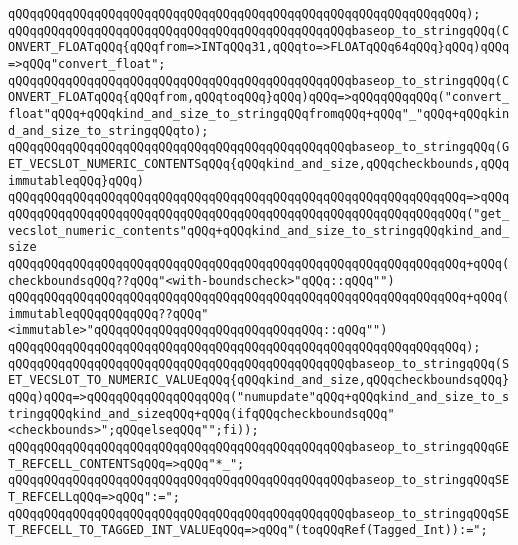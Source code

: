 \verb|qQQqqQQqqQQqqQQqqQQqqQQqqQQqqQQqqQQqqQQqqQQqqQQqqQQqqQQqqQQqqQQq);|\newline
\newline
\verb|qQQqqQQqqQQqqQQqqQQqqQQqqQQqqQQqqQQqqQQqqQQqqQQqbaseop_to_stringqQQq(CONVERT_FLOATqQQq{qQQqfrom=>INTqQQq31,qQQqto=>FLOATqQQq64qQQq}qQQq)qQQq=>qQQq"convert_float";|\newline
\verb|qQQqqQQqqQQqqQQqqQQqqQQqqQQqqQQqqQQqqQQqqQQqqQQqbaseop_to_stringqQQq(CONVERT_FLOATqQQq{qQQqfrom,qQQqtoqQQq}qQQq)qQQq=>qQQqqQQqqQQq("convert_float"qQQq+qQQqkind_and_size_to_stringqQQqfromqQQq+qQQq"_"qQQq+qQQqkind_and_size_to_stringqQQqto);|\newline
\newline
\verb|qQQqqQQqqQQqqQQqqQQqqQQqqQQqqQQqqQQqqQQqqQQqqQQqbaseop_to_stringqQQq(GET_VECSLOT_NUMERIC_CONTENTSqQQq{qQQqkind_and_size,qQQqcheckbounds,qQQqimmutableqQQq}qQQq)|\newline
\verb|qQQqqQQqqQQqqQQqqQQqqQQqqQQqqQQqqQQqqQQqqQQqqQQqqQQqqQQqqQQqqQQq=>qQQq|\newline
\verb|qQQqqQQqqQQqqQQqqQQqqQQqqQQqqQQqqQQqqQQqqQQqqQQqqQQqqQQqqQQqqQQq("get_vecslot_numeric_contents"qQQq+qQQqkind_and_size_to_stringqQQqkind_and_size|\newline
\verb|qQQqqQQqqQQqqQQqqQQqqQQqqQQqqQQqqQQqqQQqqQQqqQQqqQQqqQQqqQQqqQQq+qQQq(checkboundsqQQq??qQQq"<with-boundscheck>"qQQq::qQQq"")|\newline
\verb|qQQqqQQqqQQqqQQqqQQqqQQqqQQqqQQqqQQqqQQqqQQqqQQqqQQqqQQqqQQqqQQq+qQQq(immutableqQQqqQQqqQQq??qQQq"<immutable>"qQQqqQQqqQQqqQQqqQQqqQQqqQQqqQQq::qQQq"")|\newline
\verb|qQQqqQQqqQQqqQQqqQQqqQQqqQQqqQQqqQQqqQQqqQQqqQQqqQQqqQQqqQQqqQQq);|\newline
\newline
\verb|qQQqqQQqqQQqqQQqqQQqqQQqqQQqqQQqqQQqqQQqqQQqqQQqbaseop_to_stringqQQq(SET_VECSLOT_TO_NUMERIC_VALUEqQQq{qQQqkind_and_size,qQQqcheckboundsqQQq}qQQq)qQQq=>qQQqqQQqqQQqqQQqqQQq("numupdate"qQQq+qQQqkind_and_size_to_stringqQQqkind_and_sizeqQQq+qQQq(ifqQQqcheckboundsqQQq"<checkbounds>";qQQqelseqQQq"";fi));|\newline
\newline
\verb|qQQqqQQqqQQqqQQqqQQqqQQqqQQqqQQqqQQqqQQqqQQqqQQqbaseop_to_stringqQQqGET_REFCELL_CONTENTSqQQq=>qQQq"*_";|\newline
\verb|qQQqqQQqqQQqqQQqqQQqqQQqqQQqqQQqqQQqqQQqqQQqqQQqbaseop_to_stringqQQqSET_REFCELLqQQq=>qQQq":=";|\newline
\verb|qQQqqQQqqQQqqQQqqQQqqQQqqQQqqQQqqQQqqQQqqQQqqQQqbaseop_to_stringqQQqSET_REFCELL_TO_TAGGED_INT_VALUEqQQq=>qQQq"(toqQQqRef(Tagged_Int)):=";|\newline
